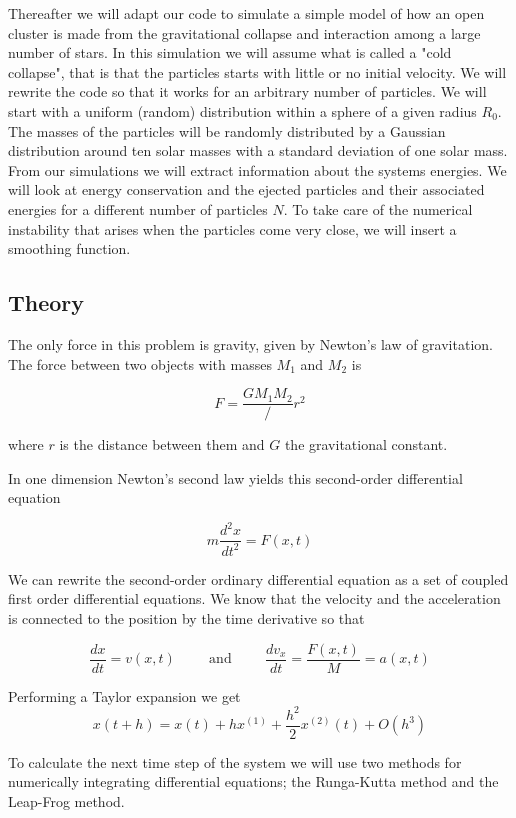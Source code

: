 \documentclass[a4paper,12pt, english]{article}
\begin{document}
Thereafter we will adapt our code to simulate a simple model of how an open cluster is made from the gravitational collapse and interaction among a large number of stars. In this simulation we will assume what is called a "cold collapse", that is that the particles starts with little or no initial velocity. We will rewrite the code so that it works for an arbitrary number of particles. We will start with a uniform (random) distribution within a sphere of a given radius $R_0$. The masses of the particles will be randomly distributed by a Gaussian distribution around ten solar masses with a standard deviation of one solar mass. From our simulations we will extract information about the systems energies. We will look at energy conservation and the ejected particles and their associated energies for a different number of particles $N$. 
To take care of the numerical instability that arises when the particles come very close, we will insert a smoothing function.      


\subsection*{Theory}

The only force in this problem is gravity, given by Newton's law of gravitation. The force between two objects with masses $M_1$ and $M_2$ is 

\[
F = \frac{GM_1 M_2}/{r^2}
\]

where $r$ is the distance between them and $G$ the gravitational constant. 

In one dimension Newton's second law yields this second-order differential equation

$$m\frac{d^2x}{dt^2} = F(x,t)$$

We can rewrite the second-order ordinary differential equation as a set of coupled first order differential equations. 
We know that the velocity and the acceleration is connected to the position by the time derivative so that

\[
\frac{dx}{dt} = v(x,t) \hspace{1cm}\mathrm{and}\hspace{1cm}
\frac{dv_x}{dt} = \frac{F(x,t)}{M} = a(x,t)
\]

Performing a Taylor expansion we get 
\[
x(t+h) = x(t) + hx^{(1)} + \frac{h^2}{2}x^{(2)}(t) + O(h^3)
\]

To calculate the next time step of the system we will use two methods for numerically integrating differential equations; the Runga-Kutta method and the Leap-Frog method.
\end{document}
